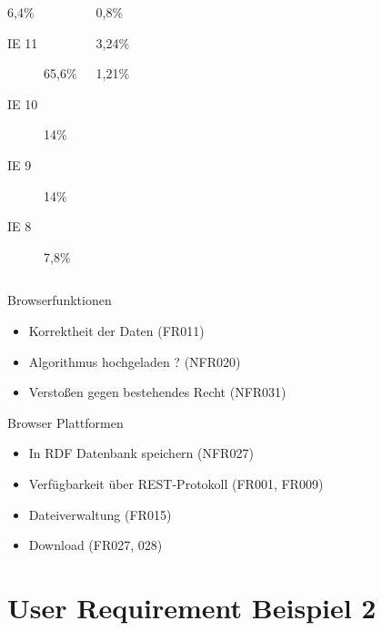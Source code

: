 \documentclass{beamer}
\begin{document}
		\begin{frame}
			\begin{columns}
				\begin{description}	
				
				\item<1->[Internet Explorer] 6,4\%
				\begin{description}
					\item[IE 11] 65,6\%
					\item[IE 10] 14\%
					\item[IE 9] 14\%
					\item[IE 8] 7,8\%
				\end{description}
				\end{description}
				\begin{description}
				\item<2->[Edge] 0,8\%
				\item<3->[Android Browser] 3,24\%
				\item<3->[MobileSafari] 1,21\%
			\end{description}
			\end{columns}
	\end{frame}
	\begin{frame}[<+->][t]{Browserfunktionen}
			\begin{itemize}	
				\item Korrektheit der Daten (FR011)
				\item Algorithmus hochgeladen ? (NFR020)
				\item Verstoßen gegen bestehendes Recht (NFR031)
			\end{itemize}
			
	\end{frame}
	\begin{frame}[<+->][t]{Browser Plattformen}
			\begin{itemize}	
				\item In RDF Datenbank speichern (NFR027)
				\item Verfügbarkeit über REST-Protokoll (FR001, FR009)
				\item Dateiverwaltung (FR015)
				\item Download (FR027, 028)
			\end{itemize}
	\end{frame}
	
	\section[UR 2]{User Requirement Beispiel 2}
\end{document}
